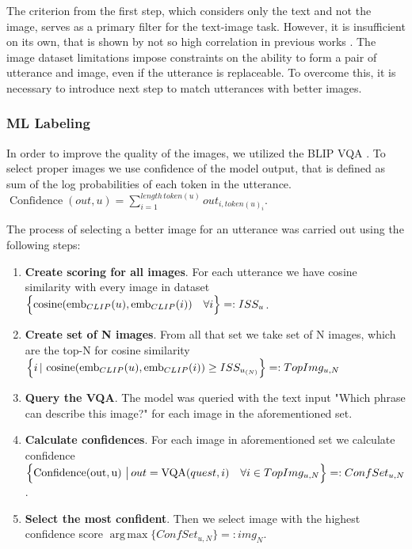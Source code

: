 \documentclass[11pt]{article}
\DeclareMathOperator*{\argmax}{arg\,max}
\begin{document}
The criterion from the first step, which considers only the text and not the image, serves as a primary filter for the text-image task. However, it is insufficient on its own, that is shown by not so high correlation in previous works \cite{Lee-2021}. The image dataset limitations impose constraints on the ability to form a pair of utterance and image, even if the utterance is replaceable. To overcome this, it is necessary to introduce next step to match utterances with better images.

\subsubsection{ML Labeling}

In order to improve the quality of the images, we utilized the BLIP VQA \cite{li2022blip}. To select proper images we use confidence of the model output, that is defined as sum of the log probabilities of each token in the utterance. $\operatorname{Confidence}(out, u) = \sum\limits_{i=1}^{length \, token(u)} out_{i, token(u)_i}$.

\smallskip

The process of selecting a better image for an utterance was carried out using the following steps:
\begin{enumerate}
    \item \textbf{Create scoring for all images}. For each utterance we have cosine similarity with every image in dataset $ \Bigl\{ \operatorname{cosine}(\operatorname{emb}_{CLIP}(u), \operatorname{emb}_{CLIP}(i)) \quad \forall i \Bigr\}   =: ISS_u$.
    
    \item \textbf{Create set of N images}. From all that set we take set of N images, which are the top-N for cosine similarity $\Bigl\{i \, | \, \operatorname{cosine}(\operatorname{emb}_{CLIP}(u), \operatorname{emb}_{CLIP}(i)) \geq ISS_{u_{(N)}} \Bigr\} =: TopImg_{u, N}$

    
    \item \textbf{Query the VQA}. The model was queried with the text input "Which phrase can describe this image?" for each image in the aforementioned set.
    


    
    \item \textbf{Calculate confidences}. For each image in aforementioned set we calculate confidence $\Bigl\{ \operatorname{Confidence(out, u)} \, \big| \, out = \operatorname{VQA}(quest, i) \quad \forall i \in TopImg_{u,N}\Bigr\} =: ConfSet_{u,N} $.

    
    \item \textbf{Select the most confident}. Then we select image with the highest confidence score $\displaystyle\argmax \{ConfSet_{u,N}\} =: img_{N}$.
\end{enumerate}
\end{document}
